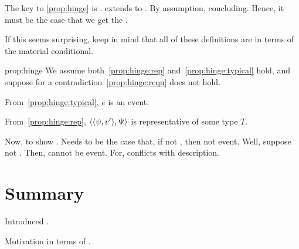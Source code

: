\begin{note}
  The key to \autoref{prop:hinge} is .
  \vtC{} extends \tC{} to .
  By assumption, concluding.
  Hence, it must be the case that we get the \fc{}.

  If this seems surprising, keep in mind that all of these definitions are in terms of the material conditional.

  \begin{argument}{prop:hinge}
    We assume both~\ref{prop:hinge:rep} and~\ref{prop:hinge:typical} hold, and suppose for a contradiction~\ref{prop:hinge:requ} does not hold.

    From~\ref{prop:hinge:typical}, \(e\) is an event.

    From~\ref{prop:hinge:rep}, \(\langle \langle \psi, v' \rangle, \Psi \rangle\) is representative of some type \(T\).

    Now, to show \requ{}.
    Needs to be the case that, if not \fc{}, then not event.
    Well, suppose not \fc{}.
    Then, cannot be event.
    For, conflicts with description.
  \end{argument}
\end{note}

\section{Summary}
\label{sec:summary-1}

\begin{note}
  Introduced .

  Motivation in terms of \tC{}.
\end{note}







